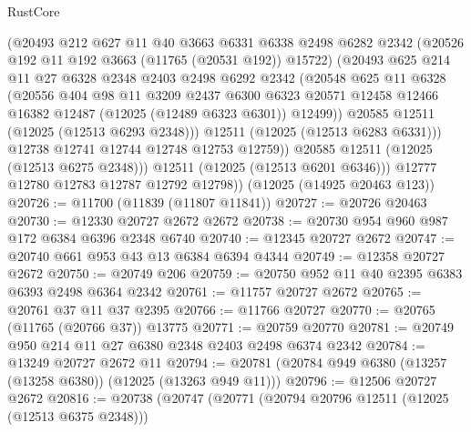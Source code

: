 \begin{lexlean}{RustCore}
\begin{coremodule}
                (@20493
                  @212
                  @627
                  @11
                  @40
                  @3663
                  @6331
                  @6338
                  @2498
                  @6282
                  @2342
                  (@20526 @192 @11 @192 @3663 (@11765 (@20531 @192)) @15722)
                  (@20493
                    @625
                    @214
                    @11
                    @27
                    @6328
                    @2348
                    @2403
                    @2498
                    @6292
                    @2342
                    (@20548
                      @625
                      @11
                      @6328
                      (@20556
                        @404
                        @98
                        @11
                        @3209
                        @2437
                        @6300
                        @6323
                        @20571
                        @12458
                        @12466
                        @16382
                        @12487
                        (@12025 (@12489 @6323 @6301))
                        @12499))
                    @20585
                    @12511
                    (@12025 (@12513 @6293 @2348)))
                  @12511
                  (@12025 (@12513 @6283 @6331)))
                @12738
                @12741
                @12744
                @12748
                @12753
                @12759))
            @20585
            @12511
            (@12025 (@12513 @6275 @2348)))
          @12511
          (@12025 (@12513 @6201 @6346)))
        @12777
        @12780
        @12783
        @12787
        @12792
        @12798))
    (@12025 (@14925 @20463 @123))
@20726 := @11700 (@11839 (@11807 @11841))
@20727 := @20726 @20463
@20730 := @12330 @20727 @2672 @2672
@20738 := @20730 @954 @960 @987 @172 @6384 @6396 @2348 @6740
@20740 := @12345 @20727 @2672
@20747 := @20740 @661 @953 @43 @13 @6384 @6394 @4344
@20749 := @12358 @20727 @2672
@20750 := @20749 @206
@20759 := @20750 @952 @11 @40 @2395 @6383 @6393 @2498 @6364 @2342
@20761 := @11757 @20727 @2672
@20765 := @20761 @37 @11 @37 @2395
@20766 := @11766 @20727
@20770 := @20765 (@11765 (@20766 @37)) @13775
@20771 := @20759 @20770
@20781 := @20749 @950 @214 @11 @27 @6380 @2348 @2403 @2498 @6374 @2342
@20784 := @13249 @20727 @2672 @11
@20794 := @20781 (@20784 @949 @6380 (@13257 (@13258 @6380)) (@12025 (@13263 @949 @11)))
@20796 := @12506 @20727 @2672
@20816 := @20738
    (@20747
      (@20771
        (@20794 @20796 @12511 (@12025 (@12513 @6375 @2348)))

\end{coremodule}
\end{lexlean}
